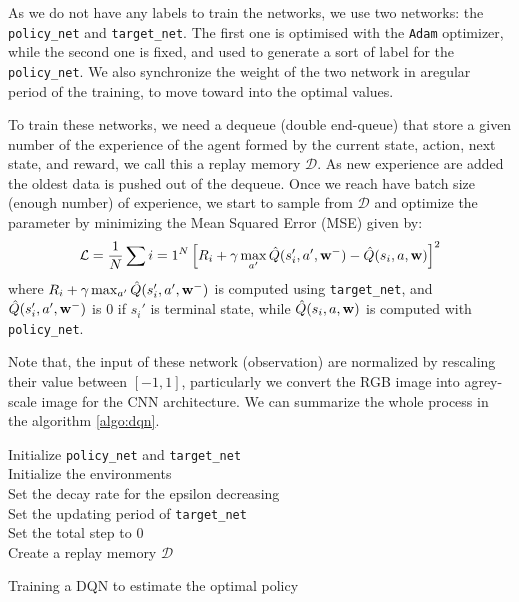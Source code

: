 As we do not have any labels to train the networks, we use two networks: the \texttt{policy\_net} and \texttt{target\_net}. The first one is optimised with the \texttt{Adam} optimizer, while the second one is fixed, and used to generate a sort of label for the \texttt{policy\_net}. We also synchronize the weight of the two network in aregular period of the training, to move toward into the optimal values.


To train these networks, we need a dequeue (double end-queue) that store a given number of the experience of the agent formed by the current state, action, next state, and reward, we call this a replay memory $\mathcal{D}$. As new experience are added the oldest data is pushed out of the dequeue.
Once we reach have batch size (enough number) of experience, we start to sample from $\mathcal{D}$ and optimize the  parameter by minimizing the Mean Squared Error (MSE) given by:
\begin{equation}
	\mathcal{L} = \frac{1}{N}\sum{i=1}^{N}\left[R_i + \gamma\max_{a'}\hat{Q}(s_i', a', \mathbf{w}^{-}) - \hat{Q}(s_i, a, \mathbf{w})\right]^2
\end{equation}
where $R_i + \gamma\max_{a'}\hat{Q}(s_i', a', \mathbf{w}^{-})$ is computed using \texttt{target\_net}, and $\hat{Q}(s_i', a', \mathbf{w}^{-})$ is $0$ if $s_i'$ is terminal state, while $\hat{Q}(s_i, a, \mathbf{w})$ is computed with \texttt{policy\_net}.


Note that, the input of these network (observation) are normalized by rescaling their value between $[-1,1]$, particularly we convert the RGB image into agrey-scale image for the CNN architecture.
We can summarize the whole process in the algorithm \ref{algo:dqn}.
\begin{algorithm}
	Initialize \texttt{policy\_net} and \texttt{target\_net}\\
	Initialize the environments\\
	Set the decay rate for the epsilon decreasing\\
	Set the updating period of \texttt{target\_net}\\
	Set the total step to $0$\\
	Create a replay memory $\mathcal{D}$\\
	\caption{Training a DQN to estimate the optimal policy}
	\label{algo:dqn}
\end{algorithm}
